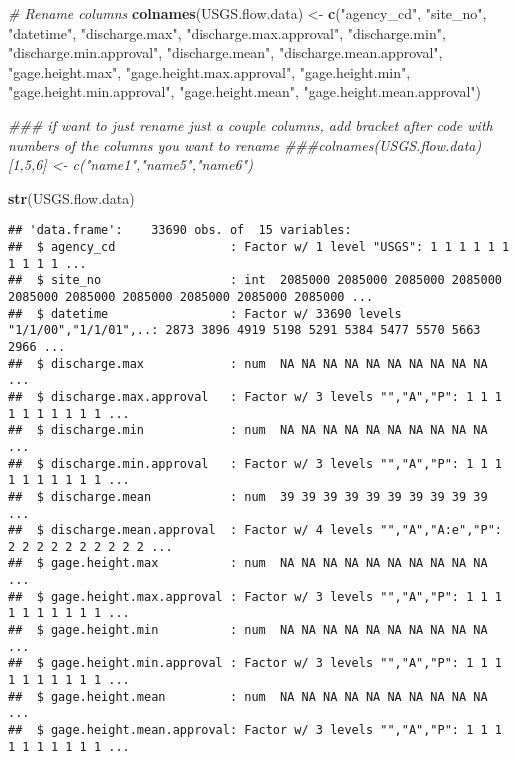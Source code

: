 \documentclass[]{article}
\newenvironment{Shaded}{\begin{snugshade}}{\end{snugshade}}
\newcommand{\CommentTok}[1]{\textcolor[rgb]{0.56,0.35,0.01}{\textit{#1}}}
\newcommand{\KeywordTok}[1]{\textcolor[rgb]{0.13,0.29,0.53}{\textbf{#1}}}
\newcommand{\NormalTok}[1]{#1}
\newcommand{\StringTok}[1]{\textcolor[rgb]{0.31,0.60,0.02}{#1}}
\begin{document}
\begin{Shaded}
\begin{Highlighting}[]
\CommentTok{# Rename columns}
\KeywordTok{colnames}\NormalTok{(USGS.flow.data) <-}\StringTok{ }\KeywordTok{c}\NormalTok{(}\StringTok{"agency_cd"}\NormalTok{, }\StringTok{"site_no"}\NormalTok{, }\StringTok{"datetime"}\NormalTok{, }
                              \StringTok{"discharge.max"}\NormalTok{, }\StringTok{"discharge.max.approval"}\NormalTok{, }
                              \StringTok{"discharge.min"}\NormalTok{, }\StringTok{"discharge.min.approval"}\NormalTok{, }
                              \StringTok{"discharge.mean"}\NormalTok{, }\StringTok{"discharge.mean.approval"}\NormalTok{, }
                              \StringTok{"gage.height.max"}\NormalTok{, }\StringTok{"gage.height.max.approval"}\NormalTok{, }
                              \StringTok{"gage.height.min"}\NormalTok{, }\StringTok{"gage.height.min.approval"}\NormalTok{, }
                              \StringTok{"gage.height.mean"}\NormalTok{, }\StringTok{"gage.height.mean.approval"}\NormalTok{)}

\CommentTok{### if want to just rename just a couple columns, add bracket after code with numbers of the columns you want to rename}
\CommentTok{###colnames(USGS.flow.data) [1,5,6] <- c("name1","name5","name6")}


\KeywordTok{str}\NormalTok{(USGS.flow.data)}
\end{Highlighting}
\end{Shaded}

\begin{verbatim}
## 'data.frame':    33690 obs. of  15 variables:
##  $ agency_cd                : Factor w/ 1 level "USGS": 1 1 1 1 1 1 1 1 1 1 ...
##  $ site_no                  : int  2085000 2085000 2085000 2085000 2085000 2085000 2085000 2085000 2085000 2085000 ...
##  $ datetime                 : Factor w/ 33690 levels "1/1/00","1/1/01",..: 2873 3896 4919 5198 5291 5384 5477 5570 5663 2966 ...
##  $ discharge.max            : num  NA NA NA NA NA NA NA NA NA NA ...
##  $ discharge.max.approval   : Factor w/ 3 levels "","A","P": 1 1 1 1 1 1 1 1 1 1 ...
##  $ discharge.min            : num  NA NA NA NA NA NA NA NA NA NA ...
##  $ discharge.min.approval   : Factor w/ 3 levels "","A","P": 1 1 1 1 1 1 1 1 1 1 ...
##  $ discharge.mean           : num  39 39 39 39 39 39 39 39 39 39 ...
##  $ discharge.mean.approval  : Factor w/ 4 levels "","A","A:e","P": 2 2 2 2 2 2 2 2 2 2 ...
##  $ gage.height.max          : num  NA NA NA NA NA NA NA NA NA NA ...
##  $ gage.height.max.approval : Factor w/ 3 levels "","A","P": 1 1 1 1 1 1 1 1 1 1 ...
##  $ gage.height.min          : num  NA NA NA NA NA NA NA NA NA NA ...
##  $ gage.height.min.approval : Factor w/ 3 levels "","A","P": 1 1 1 1 1 1 1 1 1 1 ...
##  $ gage.height.mean         : num  NA NA NA NA NA NA NA NA NA NA ...
##  $ gage.height.mean.approval: Factor w/ 3 levels "","A","P": 1 1 1 1 1 1 1 1 1 1 ...
\end{verbatim}
\end{document}
